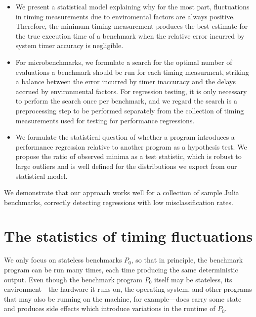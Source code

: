 \documentclass[conference]{IEEEtran}
\begin{document}
\begin{itemize}
\item
We present a statistical model explaining why for the most part, fluctuations
in timing measurements due to enviromental factors are always positive.
Therefore, the minimum timing measurement produces the best estimate for
the true execution time of a benchmark when the relative error incurred by
system timer accuracy is negligible.

\item
For microbenchmarks, we formulate a search for the optimal number of evaluations
a benchmark should be run for each timing measurment, striking a balance between
the error incurred by timer inaccuracy and the delays accrued by environmental
factors. For regression testing, it is only necessary to perform the search once
per benchmark, and we regard the search is a preprocessing step to be performed
separately from the collection of timing measurements used for testing for
performance regressions.

\item
We formulate the statistical question of whether a program introduces a performance
regression relative to another program as a hypothesis test. We propose the
ratio of observed minima as a test statistic, which is robust to large outliers
and is well defined for the distributions we expect from our statistical model.
\end{itemize}

We demonstrate that our approach works well for a collection of sample Julia
benchmarks, correctly detecting regressions with low misclassification rates.


\section{The statistics of timing fluctuations}

We only focus on stateless benchmarks $P_0$, so that in principle, the benchmark program can be run many times, each time producing the same deterministic output. Even though the benchmark program $P_0$ itself may be stateless, its environment---the hardware it runs on, the operating system, and other programs that may also be running on the machine, for example---does carry some state and produces side effects which introduce variations in the runtime of $P_0$.
\end{document}
